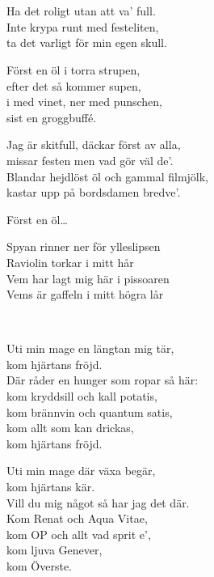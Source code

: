 \newpage

 \\       
\author{Text: D-LTH, Sångarstriden 1987}

\\
Ha det roligt utan att va' full.\\
Inte krypa runt med festeliten,\\
ta det varligt för min egen skull.

Först en öl i torra strupen,\\
efter det så kommer supen,\\
i med vinet, ner med punschen,\\
sist en groggbuffé.

Jag är skitfull, däckar först av alla,\\
missar festen men vad gör väl de'.\\
Blandar hejdlöst öl och gammal filmjölk,\\
kastar upp på bordsdamen bredve'.

Först en öl…

Spyan rinner ner för ylleslipsen\\
Raviolin torkar i mitt hår\\
Vem har lagt mig här i pissoaren\\
Vems är gaffeln i mitt högra lår


\newpage
 \\       

\songtext{}
Uti min mage en längtan mig tär, \\
kom hjärtans fröjd.\\
Där råder en hunger som ropar så här:\\
kom kryddsill och kall potatis,\\
kom brännvin och quantum satis,\\
kom allt som kan drickas,\\
kom hjärtans fröjd.

Uti min mage där växa begär,\\
kom hjärtans kär.\\
Vill du mig något så har jag det där.\\
Kom Renat och Aqua Vitae,\\
kom OP och allt vad sprit e',\\
kom ljuva Genever,\\
kom Överste.

